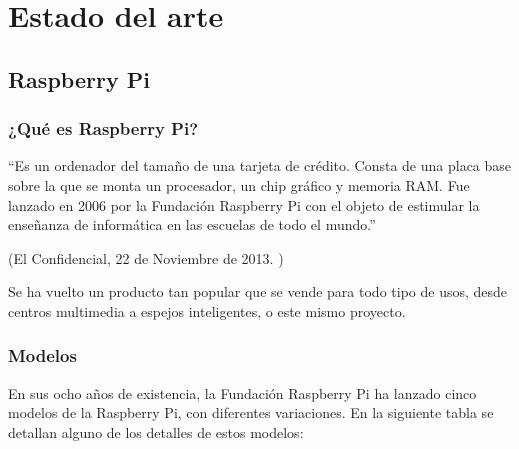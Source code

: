 
\chapter{Estado del arte} %
\label{sec:EstadoDelArte}


    \section{Raspberry Pi} %
    \label{sec:RaspberryPi}

        \subsection{¿Qué es Raspberry Pi?} %
        \label{sub:QueEsRaspberryPi}

            ``Es un ordenador del tamaño de una tarjeta de crédito. Consta de una placa base sobre la que se monta un
            procesador, un chip gráfico y memoria RAM. Fue lanzado en 2006 por la Fundación Raspberry Pi con el objeto
            de estimular la enseñanza de informática en las escuelas de todo el mundo.''

            \begin{flushright}
                (El Confidencial, 22 de Noviembre de 2013. \cite{confidencial_raspberry})
            \end{flushright}

            Se ha vuelto un producto tan popular que se vende para todo tipo de usos, desde centros
            multimedia\cite{centro_multimedia_raspberry_pi} a espejos inteligentes\cite{espejo_raspberry_pi}, o este
            mismo proyecto.


        \subsection{Modelos} %
        \label{sub:ModelosRaspberryPi}

            En sus ocho años de existencia, la Fundación Raspberry Pi ha lanzado cinco modelos de la Raspberry Pi, con
            diferentes variaciones. En la siguiente tabla se detallan alguno de los detalles de estos modelos:

